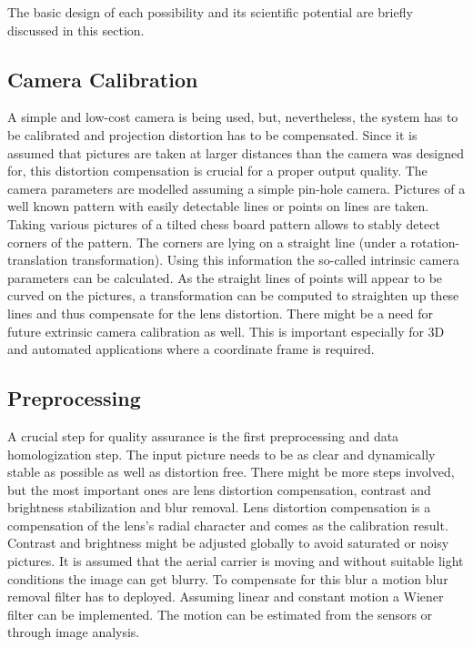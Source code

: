 \noindent
The basic design of each possibility and its scientific potential are briefly discussed in this section.

\subsection{Camera Calibration}

A simple and low-cost camera is being used, but, nevertheless, the system has to be calibrated and projection distortion has to be compensated. Since it is assumed that pictures are taken at larger distances than the camera was designed for, this distortion compensation is crucial for a proper output quality. The camera parameters are modelled assuming a simple pin-hole camera. Pictures of a well known pattern with easily detectable lines or points on lines are taken. Taking various pictures of a tilted chess board pattern allows to stably detect corners of the pattern. The corners are lying on a straight line (under a rotation-translation transformation). Using this information the so-called intrinsic camera parameters can be calculated. As the straight lines of points will appear to be curved on the pictures, a transformation can be computed to straighten up these lines and thus compensate for the lens distortion. There might be a need for future extrinsic camera calibration as well. This is important especially for 3D and automated applications where a coordinate frame is required.

\subsection{Preprocessing}
\label{sec:preprocessing}

A crucial step for quality assurance is the first preprocessing and data homologization step. The input picture needs to be as clear and dynamically stable as possible as well as distortion free. There might be more steps involved, but the most important ones are lens distortion compensation, contrast and brightness stabilization and blur removal. Lens distortion compensation is a compensation of the lens's radial character and comes as the calibration result. Contrast and brightness might be adjusted globally to avoid saturated or noisy pictures. It is assumed that the aerial carrier is moving and without suitable light conditions the image can get blurry. To compensate for this blur a motion blur
removal filter has to deployed. Assuming linear and constant motion a Wiener filter can be implemented. The motion
can be estimated from the sensors or through image analysis. 

